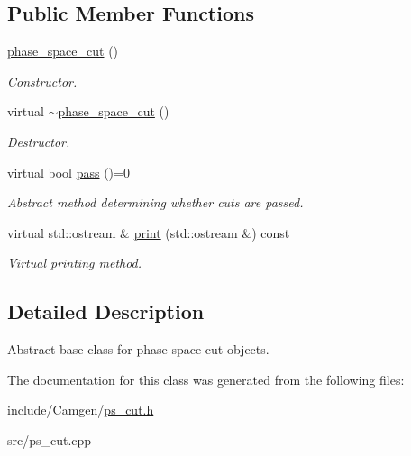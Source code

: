 \subsection*{Public Member Functions}
\begin{DoxyCompactItemize}
\item 
\hypertarget{a00413_a7b742727aae108cf4bb8db10603dbcbf}{\hyperlink{a00413_a7b742727aae108cf4bb8db10603dbcbf}{phase\-\_\-space\-\_\-cut} ()}\label{a00413_a7b742727aae108cf4bb8db10603dbcbf}

\begin{DoxyCompactList}\small\item\em Constructor. \end{DoxyCompactList}\item 
\hypertarget{a00413_aab826cb9424718c144c713f9e44a036f}{virtual \hyperlink{a00413_aab826cb9424718c144c713f9e44a036f}{$\sim$phase\-\_\-space\-\_\-cut} ()}\label{a00413_aab826cb9424718c144c713f9e44a036f}

\begin{DoxyCompactList}\small\item\em Destructor. \end{DoxyCompactList}\item 
\hypertarget{a00413_aa156dd35d45942961416a5fbe95a8ae0}{virtual bool \hyperlink{a00413_aa156dd35d45942961416a5fbe95a8ae0}{pass} ()=0}\label{a00413_aa156dd35d45942961416a5fbe95a8ae0}

\begin{DoxyCompactList}\small\item\em Abstract method determining whether cuts are passed. \end{DoxyCompactList}\item 
\hypertarget{a00413_a526f3e8c8f5a637d5bc2d143ce867e6a}{virtual std\-::ostream \& \hyperlink{a00413_a526f3e8c8f5a637d5bc2d143ce867e6a}{print} (std\-::ostream \&) const }\label{a00413_a526f3e8c8f5a637d5bc2d143ce867e6a}

\begin{DoxyCompactList}\small\item\em Virtual printing method. \end{DoxyCompactList}\end{DoxyCompactItemize}


\subsection{Detailed Description}
Abstract base class for phase space cut objects. 

The documentation for this class was generated from the following files\-:\begin{DoxyCompactItemize}
\item 
include/\-Camgen/\hyperlink{a00713}{ps\-\_\-cut.\-h}\item 
src/ps\-\_\-cut.\-cpp\end{DoxyCompactItemize}
